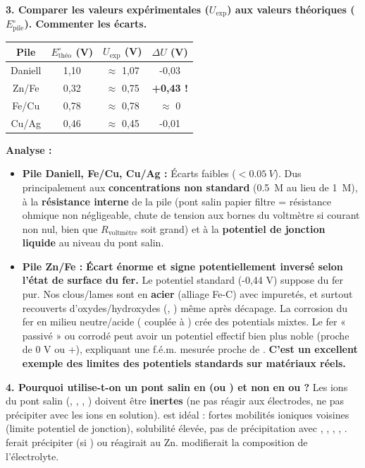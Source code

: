 \documentclass[11pt]{article}
\begin{document}
\begin{exoresolu}
\textbf{3. Comparer les valeurs expérimentales ($U_{\text{exp}}$) aux valeurs théoriques ($E^\circ_{\text{pile}}$). Commenter les écarts.}
\tcblower
\begin{center}
\setlength{\tabcolsep}{4pt}
\begin{tabular}{|c|c|c|c|}\hline
\rowcolor{popblueL} \textbf{Pile} & $E^\circ_{\text{théo}}$ (V) & $U_{\text{exp}}$ (V) & $\Delta U$ (V) \\\hline
Daniell & 1,10 & $\approx$ 1,07 & -0,03 \\\hline
Zn/Fe & 0,32 & $\approx$ 0,75 & \textbf{+0,43 !} \\\hline
Fe/Cu & 0,78 & $\approx$ 0,78 & $\approx$ 0 \\\hline
Cu/Ag & 0,46 & $\approx$ 0,45 & -0,01 \\\hline
\end{tabular}
\end{center}
\textbf{Analyse :}
\begin{itemize}
    \item \textbf{Pile Daniell, Fe/Cu, Cu/Ag :} Écarts faibles ($< \SI{0,05}{V}$). Dus principalement aux \textbf{concentrations non standard} (\SI{0,5}{M} au lieu de \SI{1}{M}), à la \textbf{résistance interne} de la pile (pont salin papier filtre = résistance ohmique non négligeable, chute de tension aux bornes du voltmètre si courant non nul, bien que $R_{\text{voltmètre}}$ soit grand) et à la \textbf{potentiel de jonction liquide} au niveau du pont salin.
    \item \textbf{Pile Zn/Fe :} \textbf{Écart énorme et signe potentiellement inversé selon l'état de surface du fer.} Le potentiel standard  (-0,44 V) suppose du fer pur. Nos clous/lames sont en \textbf{acier} (alliage Fe-C) avec impuretés, et surtout recouverts d'oxydes/hydroxydes (, ) même après décapage. La corrosion du fer en milieu neutre/acide ( couplée à ) crée des potentials mixtes. Le fer « passivé » ou corrodé peut avoir un potentiel effectif bien plus noble (proche de 0 V ou +), expliquant une f.é.m. mesurée proche de . \textbf{C'est un excellent exemple des limites des potentiels standards sur matériaux réels.}
\end{itemize}

\textbf{4. Pourquoi utilise-t-on un pont salin en  (ou ) et non en  ou  ?}
\tcblower
Les ions du pont salin (, , , ) doivent être \textbf{inertes} (ne pas réagir aux électrodes, ne pas précipiter avec les ions en solution).  est idéal : fortes mobilités ioniques voisines (limite potentiel de jonction), solubilité élevée, pas de précipitation avec , , , , .  ferait précipiter  (si ) ou réagirait au Zn.  modifierait la composition de l'électrolyte.


\end{exoresolu}
\end{document}
